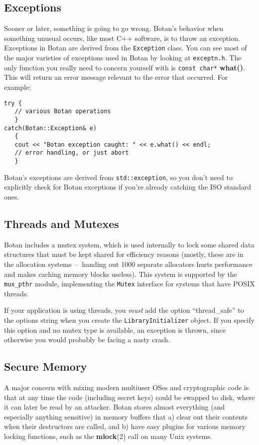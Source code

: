 \documentclass{article}
\newcommand{\filename}[1]{\texttt{#1}}
\newcommand{\function}[1]{\textbf{#1}}
\newcommand{\type}[1]{\texttt{#1}}
\begin{document}
\subsection{Exceptions}

Sooner or later, something is going to go wrong. Botan's behavior when
something unusual occurs, like most C++ software, is to throw an exception.
Exceptions in Botan are derived from the \type{Exception} class. You can see
most of the major varieties of exceptions used in Botan by looking at
\filename{exceptn.h}. The only function you really need to concern yourself
with is \type{const char*} \function{what()}. This will return an error message
relevant to the error that occurred. For example:

\begin{verbatim}
try {
   // various Botan operations
   }
catch(Botan::Exception& e)
   {
   cout << "Botan exception caught: " << e.what() << endl;
   // error handling, or just abort
   }
\end{verbatim}

Botan's exceptions are derived from \type{std::exception}, so you don't need
to explicitly check for Botan exceptions if you're already catching the ISO
standard ones.

\subsection{Threads and Mutexes}

Botan includes a mutex system, which is used internally to lock some shared
data structures that must be kept shared for efficiency reasons (mostly, these
are in the allocation systems~--~handing out 1000 separate allocators hurts
performance and makes caching memory blocks useless). This system is supported
by the \texttt{mux\_pthr} module, implementing the \type{Mutex} interface for
systems that have POSIX threads.

If your application is using threads, you \emph{must} add the option
``thread\_safe'' to the options string when you create the
\type{LibraryInitializer} object. If you specify this option and no mutex type
is available, an exception is thrown, since otherwise you would probably be
facing a nasty crash.

\subsection{Secure Memory}

A major concern with mixing modern multiuser OSes and cryptographic
code is that at any time the code (including secret keys) could be
swapped to disk, where it can later be read by an attacker. Botan
stores almost everything (and especially anything sensitive) in memory
buffers that a) clear out their contents when their destructors are
called, and b) have easy plugins for various memory locking functions,
such as the \function{mlock}(2) call on many Unix systems.
\end{document}
